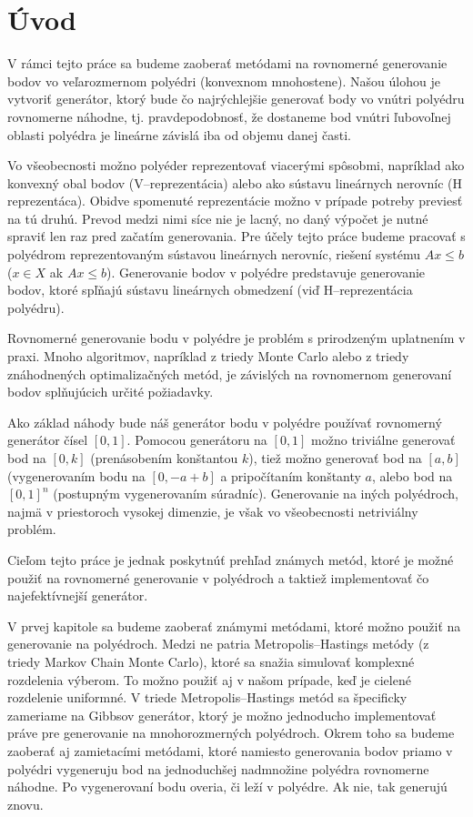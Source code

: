 \chapter*{Úvod} %

V rámci tejto práce sa budeme zaoberať metódami na rovnomerné generovanie bodov vo veľarozmernom polyédri (konvexnom mnohostene). Našou úlohou je vytvoriť generátor, ktorý bude čo najrýchlejšie generovať body vo vnútri polyédru rovnomerne náhodne, tj. pravdepodobnosť, že dostaneme bod vnútri ľubovoľnej oblasti polyédra je lineárne závislá iba od objemu danej časti.

Vo všeobecnosti možno polyéder reprezentovať viacerými spôsobmi, napríklad ako konvexný obal bodov (V--reprezentácia) alebo ako sústavu lineárnych nerovníc (H reprezentáca). Obidve spomenuté reprezentácie možno v prípade potreby previesť na tú druhú. Prevod medzi nimi síce nie je lacný, no daný výpočet je nutné spraviť len raz pred začatím generovania. Pre účely tejto práce budeme pracovať s polyédrom reprezentovaným sústavou lineárnych nerovníc, riešení systému $Ax \leq b$ ($x \in X$ ak $Ax \leq b$).
Generovanie bodov v polyédre predstavuje generovanie bodov, ktoré spľňajú sústavu lineárnych obmedzení (viď H--reprezentácia polyédru).

Rovnomerné generovanie bodu v polyédre je problém s prirodzeným uplatnením v praxi. Mnoho algoritmov, napríklad z triedy Monte Carlo alebo z triedy znáhodnených optimalizačných metód, je závislých na rovnomernom generovaní bodov splňujúcich určité požiadavky.

Ako základ náhody bude náš generátor bodu v polyédre používať rovnomerný generátor čísel $[0,1]$. Pomocou generátoru na $[0,1]$ možno triviálne generovať bod na $[0,k]$ (prenásobením konštantou $k$), tiež možno generovať bod na $[a,b]$ (vygenerovaním bodu na $[0, -a+b]$ a pripočítaním konštanty $a$, alebo bod na $[0,1]^n$ (postupným vygenerovaním súradníc). Generovanie na iných polyédroch, najmä v priestoroch vysokej dimenzie, je však vo všeobecnosti netriviálny problém.

Cieľom tejto práce je jednak poskytnúť prehľad známych metód, ktoré je možné použiť na rovnomerné generovanie v polyédroch a taktiež implementovať čo najefektívnejší generátor.

V prvej kapitole sa budeme zaoberať známymi metódami, ktoré možno použiť na generovanie na polyédroch. Medzi ne patria Metropolis--Hastings metódy (z triedy Markov Chain Monte Carlo), ktoré sa snažia simulovať komplexné rozdelenia výberom. To možno použiť aj v našom prípade, keď je cielené rozdelenie uniformné. V triede Metropolis--Hastings metód sa špecificky zameriame na Gibbsov generátor, ktorý je možno jednoducho implementovať práve pre generovanie na mnohorozmerných polyédroch.
Okrem toho sa budeme zaoberať aj zamietacími metódami, ktoré namiesto generovania bodov priamo v polyédri vygeneruju bod na jednoduchšej nadmnožine polyédra rovnomerne náhodne. Po vygenerovaní bodu overia, či leží v polyédre. Ak nie, tak generujú znovu.

